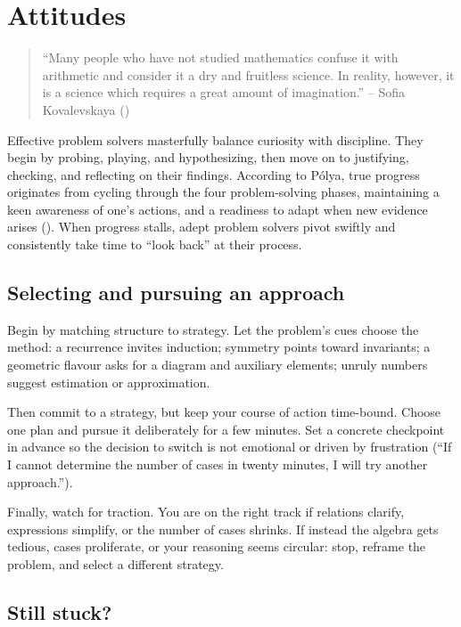 \documentclass[
  a4paper,
  DIV=11,
  numbers=noendperiod,
  oneside]{scrreprt}
\begin{document}
\chapter{Attitudes}\label{sec-attitudes}

\begin{quote}
``Many people who have not studied mathematics confuse it with
arithmetic and consider it a dry and fruitless science. In reality,
however, it is a science which requires a great amount of imagination.''
-- Sofia Kovalevskaya ()
\end{quote}

Effective problem solvers masterfully balance curiosity with discipline.
They begin by probing, playing, and hypothesizing, then move on to
justifying, checking, and reflecting on their findings. According to
Pólya, true progress originates from cycling through the four
problem-solving phases, maintaining a keen awareness of one's actions,
and a readiness to adapt when new evidence arises
(). When progress stalls, adept
problem solvers pivot swiftly and consistently take time to ``look
back'' at their process.

\section{Selecting and pursuing an
approach}\label{selecting-and-pursuing-an-approach}

Begin by matching structure to strategy. Let the problem's cues choose
the method: a recurrence invites induction; symmetry points toward
invariants; a geometric flavour asks for a diagram and auxiliary
elements; unruly numbers suggest estimation or approximation.

Then commit to a strategy, but keep your course of action time-bound.
Choose one plan and pursue it deliberately for a few minutes. Set a
concrete checkpoint in advance so the decision to switch is not
emotional or driven by frustration (``If I cannot determine the number
of cases in twenty minutes, I will try another approach.'').

Finally, watch for traction. You are on the right track if relations
clarify, expressions simplify, or the number of cases shrinks. If
instead the algebra gets tedious, cases proliferate, or your reasoning
seems circular: stop, reframe the problem, and select a different
strategy.

\section{Still stuck?}\label{still-stuck}
\end{document}
